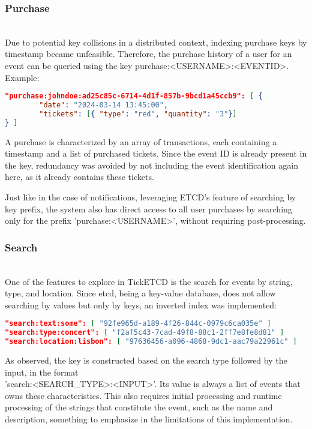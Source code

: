 \documentclass[screen,review]{acmart}
\begin{document}
\subsubsection{Purchase}~\\
Due to potential key collisions in a distributed context, indexing purchase keys by timestamp became unfeasible. Therefore, the purchase history of a user for an event can be queried using the key purchase:<USERNAME>:<EVENTID>. Example:

\begin{lstlisting}[language=json]
"purchase:johndoe:ad25c85c-6714-4d1f-857b-9bcd1a45ccb9": [ {
        "date": "2024-03-14 13:45:00",
        "tickets": [{ "type": "red", "quantity": "3"}]
} ]
\end{lstlisting}

A purchase is characterized by an array of transactions, each containing a timestamp and a list of purchased tickets. Since the event ID is already present in the key, redundancy was avoided by not including the event identification again here, as it already contains these tickets.

Just like in the case of notifications, leveraging ETCD's feature of searching by key prefix, the system also has direct access to all user purchases by searching only for the prefix 'purchase:<USERNAME>', without requiring post-processing.\\

\subsubsection{Search}~\\
One of the features to explore in TickETCD is the search for events by string, type, and location. Since etcd, being a key-value database, does not allow searching by values but only by keys, an inverted index was implemented:

\begin{lstlisting}[language=json]
"search:text:some": [ "92fe965d-a189-4f26-844c-0979c6ca035e" ]
"search:type:concert": [ "f2af5c43-7cad-49f8-88c1-2ff7e8fe8d81" ]
"search:location:lisbon": [ "97636456-a096-4868-9dc1-aac79a22961c" ]
\end{lstlisting}

As observed, the key is constructed based on the search type followed by the input, in the format \\ 'search:<SEARCH\_TYPE>:<INPUT>'. Its value is always a list of events that owns these characteristics. This also requires initial processing and runtime processing of the strings that constitute the event, such as the name and description, something to emphasize in the limitations of this implementation.
\end{document}
